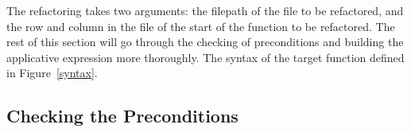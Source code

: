 The refactoring takes two arguments: the filepath of the file to be refactored, and the row and column in the file of the start of the function to be refactored. The rest of this section will go through the checking of preconditions and building the applicative expression more thoroughly. The syntax of the target function \DIFdelbegin {}\DIFdelend \DIFaddbegin {}\DIFaddend defined in Figure~\ref{syntax}.



\DIFdelbegin \subsubsection{}
\addtocounter{subsubsection}{-1}%
\DIFdelend \DIFaddbegin \subsection{Checking the Preconditions}
\DIFaddend 

